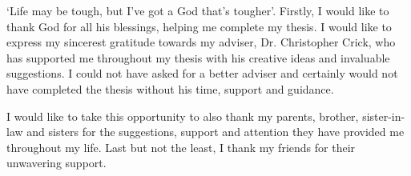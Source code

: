 `Life may be tough, but I've got a God that's tougher'. Firstly, I would like to thank God for all his blessings, helping me complete my thesis. I would like to express my sincerest gratitude towards my adviser, Dr. Christopher Crick, who has supported me throughout my thesis with his creative ideas and invaluable suggestions. I could not have asked for a better adviser and certainly would not have completed the thesis without his time, support and guidance.

I would like to take this opportunity to also thank my parents, brother, sister-in-law and sisters for the suggestions, support and attention they have provided me throughout my life. Last but not the least, I thank my friends for their unwavering support.